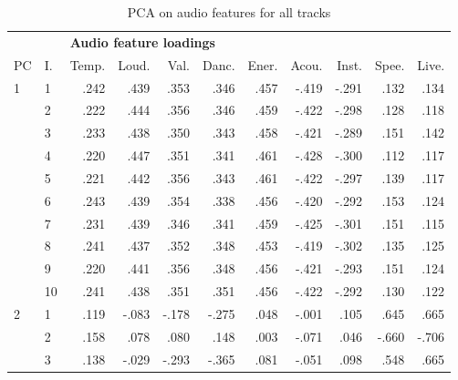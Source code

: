 \begin{table}[ht]
\centering
\scriptsize

\begin{threeparttable}
\caption{PCA on audio features for all tracks}
\label{tab:val-5}

\begin{tabular*}{\textwidth}{@{\extracolsep{\fill}}llrrrrrrrrr@{}}

\toprule && 
\multicolumn{9}{l}{\textbf{Audio feature loadings}} \\
\cmidrule{3-11}

PC & I. & Temp. & Loud. & Val. & Danc. & Ener. & Acou. & Inst. & Spee. & Live. \\ 
\midrule

1  & 1         & .242  & .439     & .353    & .346   & .457   & -.419   & -.291   & .132    & .134     \\
   & 2         & .222  & .444     & .356    & .346   & .459   & -.422   & -.298   & .128    & .118     \\
   & 3         & .233  & .438     & .350    & .343   & .458   & -.421   & -.289   & .151    & .142     \\
   & 4         & .220  & .447     & .351    & .341   & .461   & -.428   & -.300   & .112    & .117     \\
   & 5         & .221  & .442     & .356    & .343   & .461   & -.422   & -.297   & .139    & .117     \\
   & 6         & .243  & .439     & .354    & .338   & .456   & -.420   & -.292   & .153    & .124     \\
   & 7         & .231  & .439     & .346    & .341   & .459   & -.425   & -.301   & .151    & .115     \\
   & 8         & .241  & .437     & .352    & .348   & .453   & -.419   & -.302   & .135    & .125     \\
   & 9         & .220  & .441     & .356    & .348   & .456   & -.421   & -.293   & .151    & .124     \\
   & 10        & .241  & .438     & .351    & .351   & .456   & -.422   & -.292   & .130    & .122     \\
2  & 1         & .119  & -.083    & -.178   & -.275  & .048   & -.001   & .105    & .645    & .665     \\
   & 2         & .158  & .078     & .080    & .148   & .003   & -.071   & .046    & -.660   & -.706    \\
   & 3         & .138  & -.029    & -.293   & -.365  & .081   & -.051   & .098    & .548    & .665     \\

\end{tabular*}
\end{threeparttable}
\end{table}
